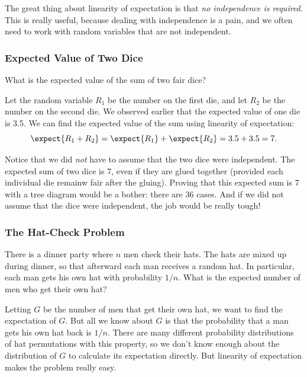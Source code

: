 The great thing about linearity of expectation is that \emph{no
independence is required}.  This is really useful, because dealing with
independence is a pain, and we often need to work with random variables
that are not independent.

\subsubsection{Expected Value of Two Dice}

What is the expected value of the sum of two fair dice?

Let the random variable $R_1$ be the number on the first die, and let
$R_2$ be the number on the second die.  We observed earlier that the
expected value of one die is 3.5.  We can find the expected value of the
sum using linearity of expectation:
\begin{equation*}
\expect{R_1 + R_2} 
 =   \expect{R_1} + \expect{R_2}
 =    3.5 + 3.5
 =    7.
\end{equation*}

Notice that we did \emph{not} have to assume that the two dice were
independent.  The expected sum of two dice is 7, even if they are glued
together (provided each individual die remainw fair after the gluing).
Proving that this expected sum is 7 with a tree diagram would be a bother:
there are 36 cases.  And if we did not assume that the dice were
independent, the job would be really tough!

\subsubsection{The Hat-Check Problem}

There is a dinner party where $n$ men check their hats.  The hats are
mixed up during dinner, so that afterward each man receives a random hat.
In particular, each man gets his own hat with probability $1/n$.  What is
the expected number of men who get their own hat?

Letting $G$ be the number of men that get their own hat, we want to find
the expectation of $G$.  But all we know about $G$ is that the probability
that a man gets his own hat back is $1/n$.  There are many different
probability distributions of hat permutations with this property, so we
don't know enough about the distribution of $G$ to calculate its
expectation directly.  But linearity of expectation makes the problem
really easy.

